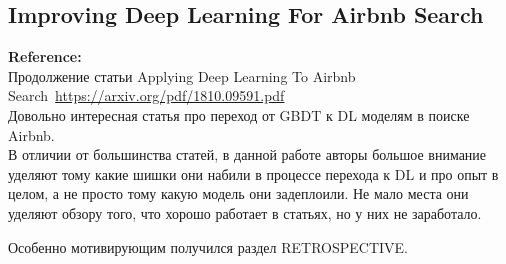 \begin{bibunit}[plainnat]
\section*{Improving Deep Learning For Airbnb Search}

\textbf{Reference:}~\cite{haldar2020improving} \\

Продолжение статьи Applying Deep Learning To Airbnb Search~\url{https://arxiv.org/pdf/1810.09591.pdf} \\

Довольно интересная статья про переход от GBDT к DL моделям в поиске Airbnb. \\

В отличии от большинства статей, в данной работе авторы большое внимание уделяют тому какие шишки они набили в процессе перехода к DL и про опыт в целом, а не просто тому какую модель они задеплоили. Не мало места они уделяют обзору того, что хорошо работает в статьях, но у них не заработало. 

Особенно мотивирующим получился раздел RETROSPECTIVE. 


\putbib[refs_dl]
\end{bibunit}
